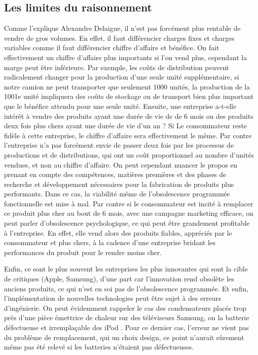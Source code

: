 \subsection{Les limites du raisonnement}


Comme l’explique Alexandre Delaigue, il n’est pas forcément plus rentable de vendre de gros volumes. En effet, il faut différencier charges fixes et charges variables comme il faut différencier chiffre d’affaire et bénéfice. On fait effectivement un chiffre d’affaire plus importants si l’on vend plus, cependant la marge peut être inférieure. Par exemple, les coûts de distribution peuvent radicalement changer pour la production d’une seule unité supplémentaire, si notre camion ne peut transporter que seulement  1000 unités,  la production de la 1001e unité impliquera des coûts de stockage ou de transport bien plus important que le bénéfice attendu pour une seule unité. Ensuite, une entreprise a-t-elle intérêt à vendre des produits ayant une durée de vie de de 6 mois ou des produits deux fois plus chers ayant une durée de vie d’un an ? Si Le consommateur reste fidèle à cette entreprise, le chiffre d’affaire sera effectivement le même. Par contre l’entreprise n’a pas forcément envie de passer deux fois par les processus de productions et de distributions, qui ont un coût proportionnel au nombre d’unités vendues, et non au chiffre d’affaire. On peut cependant nuancer le propos en prenant en compte des compétences, matières premières  et des phases de recherche et développement nécessaires pour la fabrication de produits plus performants. Dans ce cas, la viabilité même de l’obsolescence programmée fonctionnelle est mise à mal. Par contre si le consommateur est incité à remplacer ce produit plus cher au bout de 6 mois, avec une campagne marketing efficace, on peut parler d’obsolescence psychologique, ce qui peut être grandement  profitable à l’entreprise. En effet, elle vend alors des produits fiables, appréciés par le consommateur et plus chers, à la cadence d’une entreprise bridant les performances du produit pour le rendre moins cher.

\bigbreak
Enfin, ce sont le plus souvent les entreprises les plus innovantes qui sont la cible de critiques (Apple, Samsung), d’une part car l’innovation rend obsolète les anciens produits, ce qui n’est en soi pas de l’obsolescence programmée. Et enfin, l’implémentation de nouvelles technologies peut être sujet à des erreurs d’ingénierie. On peut évidemment rappeler le cas des condensateurs placés trop près d’une pièce émettrice de  chaleur sur des téléviseurs Samsung, ou la batterie défectueuse et irremplaçable des iPod . Pour ce dernier cas, l’erreur ne vient pas du problème de remplacement, qui un choix design, ce point n’aurait sûrement même pas été relevé si les batteries n’étaient pas défectueuses.

\newpage